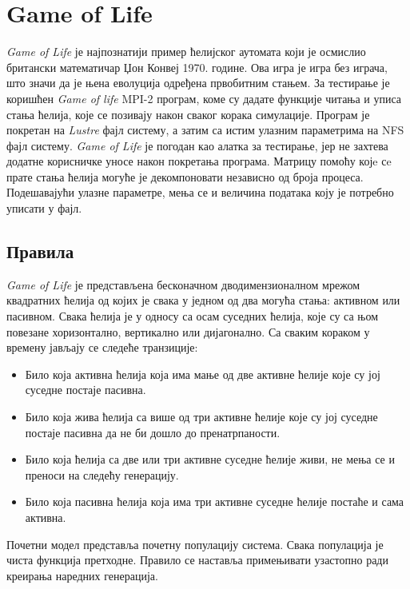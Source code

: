 \section{Game of Life}
\textit{Game of Life} је најпознатији пример ћелијског аутомата који је осмислио британски математичар Џон Конвеј 1970. године. Ова игра је игра без играча, што значи да је њена еволуција одређена првобитним стањем. 
За тестирање је коришћен \textit{Game of life} MPI-2 програм, коме су дадате функције читања и уписа стања ћелија, које се позивају након сваког корака симулације. Програм је покретан на \textit{Lustre} фајл систему, а затим са истим улазним параметрима на NFS фајл систему. \textit{Game of Life} је погодан као алатка за тестирање, јер не захтева додатне корисничке уносе након покретања програма. Матрицу помоћу којe сe прате стања ћелија могуће је декомпоновати независно од броја процеса. Подешавајући улазне параметре, мења се и величина података коју је потребно уписати у фајл.

\subsection{Правила}
\textit{Game of Life} је представљена бесконачном дводимензионалном мрежом квадратних ћелија од којих је свака у једном од два могућа стања: активном или пасивном. Свака ћелија је у односу са осам суседних ћелија, које су са њом повезане хоризонтално, вертикално или дијагонално. Са сваким кораком у времену јављају се следеће транзиције:

\begin{itemize}
\item Било која активна ћелија која има мање од две активне ћелије које су јој суседне постаје пасивна.
\item Било која жива ћелија са више од три активне ћелије које су јој суседне постаје пасивна да не би дошло до пренатрпаности.
\item Било која ћелија са две или три активне суседне ћелије живи, не мења се и преноси на следећу генерацију.
\item Било која пасивна ћелија која има три активне суседне ћелије постаће и сама активна.
\end{itemize}

Почетни модел представља почетну популацију система. Свака популација је чиста функција претходне. Правило се наставља примењивати узастопно ради креирања наредних генерација.

